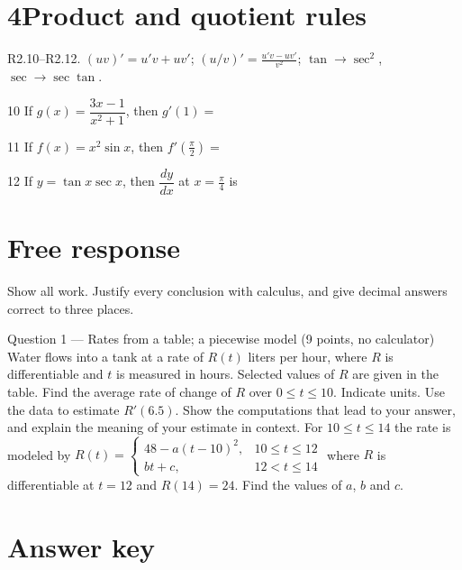 \documentclass{apcalc}
\begin{document}
\section*{4\quad Product and quotient rules}
\begin{setrule}R2.10–R2.12. $(uv)'=u'v+uv'$; $(u/v)'=\frac{u'v-uv'}{v^2}$; $\tan\to\sec^2$, $\sec\to\sec\tan$.\end{setrule}
\begin{q}{10}
If $g(x)=\dfrac{3x-1}{x^2+1}$, then $g'(1)=$
\end{q}
\begin{q}{11}
If $f(x)=x^2\sin x$, then $f'\!\left(\frac{\pi}{2}\right)=$
\end{q}
\begin{q}{12}
If $y=\tan x\sec x$, then $\dfrac{dy}{dx}$ at $x=\frac{\pi}{4}$ is
\end{q}
\clearpage\section*{Free response}
Show all work. Justify every conclusion with calculus, and give decimal answers correct to three places.
\begin{frq}{Question 1 --- Rates from a table; a piecewise model (9 points, no calculator)}
Water flows into a tank at a rate of $R(t)$ liters per hour, where $R$ is differentiable and $t$ is measured in hours. Selected values of $R$ are given in the table.
Find the average rate of change of $R$ over $0\le t\le10$. Indicate units.\workspace{1.6in}
Use the data to estimate $R'(6.5)$. Show the computations that lead to your answer, and explain the meaning of your estimate in context.\workspace{1.6in}
For $10\le t\le14$ the rate is modeled by $R(t)=\begin{cases}48-a(t-10)^2,&10\le t\le12\\ bt+c,&12<t\le14\end{cases}$ where $R$ is differentiable at $t=12$ and $R(14)=24$. Find the values of $a$, $b$ and $c$.\workspace{1.6in}
\end{frq}
\clearpage\section*{Answer key}
\end{document}
